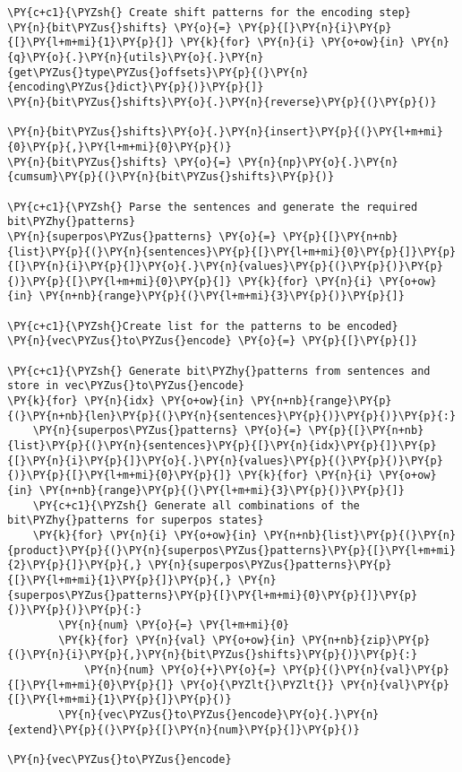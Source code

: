     \begin{tcolorbox}[breakable, size=fbox, boxrule=1pt, pad at break*=1mm,colback=cellbackground, colframe=cellborder]
\begin{Verbatim}[commandchars=\\\{\}]
\PY{c+c1}{\PYZsh{} Create shift patterns for the encoding step}
\PY{n}{bit\PYZus{}shifts} \PY{o}{=} \PY{p}{[}\PY{n}{i}\PY{p}{[}\PY{l+m+mi}{1}\PY{p}{]} \PY{k}{for} \PY{n}{i} \PY{o+ow}{in} \PY{n}{q}\PY{o}{.}\PY{n}{utils}\PY{o}{.}\PY{n}{get\PYZus{}type\PYZus{}offsets}\PY{p}{(}\PY{n}{encoding\PYZus{}dict}\PY{p}{)}\PY{p}{]}
\PY{n}{bit\PYZus{}shifts}\PY{o}{.}\PY{n}{reverse}\PY{p}{(}\PY{p}{)}

\PY{n}{bit\PYZus{}shifts}\PY{o}{.}\PY{n}{insert}\PY{p}{(}\PY{l+m+mi}{0}\PY{p}{,}\PY{l+m+mi}{0}\PY{p}{)}
\PY{n}{bit\PYZus{}shifts} \PY{o}{=} \PY{n}{np}\PY{o}{.}\PY{n}{cumsum}\PY{p}{(}\PY{n}{bit\PYZus{}shifts}\PY{p}{)}

\PY{c+c1}{\PYZsh{} Parse the sentences and generate the required bit\PYZhy{}patterns}
\PY{n}{superpos\PYZus{}patterns} \PY{o}{=} \PY{p}{[}\PY{n+nb}{list}\PY{p}{(}\PY{n}{sentences}\PY{p}{[}\PY{l+m+mi}{0}\PY{p}{]}\PY{p}{[}\PY{n}{i}\PY{p}{]}\PY{o}{.}\PY{n}{values}\PY{p}{(}\PY{p}{)}\PY{p}{)}\PY{p}{[}\PY{l+m+mi}{0}\PY{p}{]} \PY{k}{for} \PY{n}{i} \PY{o+ow}{in} \PY{n+nb}{range}\PY{p}{(}\PY{l+m+mi}{3}\PY{p}{)}\PY{p}{]}

\PY{c+c1}{\PYZsh{}Create list for the patterns to be encoded}
\PY{n}{vec\PYZus{}to\PYZus{}encode} \PY{o}{=} \PY{p}{[}\PY{p}{]}

\PY{c+c1}{\PYZsh{} Generate bit\PYZhy{}patterns from sentences and store in vec\PYZus{}to\PYZus{}encode}
\PY{k}{for} \PY{n}{idx} \PY{o+ow}{in} \PY{n+nb}{range}\PY{p}{(}\PY{n+nb}{len}\PY{p}{(}\PY{n}{sentences}\PY{p}{)}\PY{p}{)}\PY{p}{:}
    \PY{n}{superpos\PYZus{}patterns} \PY{o}{=} \PY{p}{[}\PY{n+nb}{list}\PY{p}{(}\PY{n}{sentences}\PY{p}{[}\PY{n}{idx}\PY{p}{]}\PY{p}{[}\PY{n}{i}\PY{p}{]}\PY{o}{.}\PY{n}{values}\PY{p}{(}\PY{p}{)}\PY{p}{)}\PY{p}{[}\PY{l+m+mi}{0}\PY{p}{]} \PY{k}{for} \PY{n}{i} \PY{o+ow}{in} \PY{n+nb}{range}\PY{p}{(}\PY{l+m+mi}{3}\PY{p}{)}\PY{p}{]}
    \PY{c+c1}{\PYZsh{} Generate all combinations of the bit\PYZhy{}patterns for superpos states}
    \PY{k}{for} \PY{n}{i} \PY{o+ow}{in} \PY{n+nb}{list}\PY{p}{(}\PY{n}{product}\PY{p}{(}\PY{n}{superpos\PYZus{}patterns}\PY{p}{[}\PY{l+m+mi}{2}\PY{p}{]}\PY{p}{,} \PY{n}{superpos\PYZus{}patterns}\PY{p}{[}\PY{l+m+mi}{1}\PY{p}{]}\PY{p}{,} \PY{n}{superpos\PYZus{}patterns}\PY{p}{[}\PY{l+m+mi}{0}\PY{p}{]}\PY{p}{)}\PY{p}{)}\PY{p}{:}
        \PY{n}{num} \PY{o}{=} \PY{l+m+mi}{0}
        \PY{k}{for} \PY{n}{val} \PY{o+ow}{in} \PY{n+nb}{zip}\PY{p}{(}\PY{n}{i}\PY{p}{,}\PY{n}{bit\PYZus{}shifts}\PY{p}{)}\PY{p}{:}
            \PY{n}{num} \PY{o}{+}\PY{o}{=} \PY{p}{(}\PY{n}{val}\PY{p}{[}\PY{l+m+mi}{0}\PY{p}{]} \PY{o}{\PYZlt{}\PYZlt{}} \PY{n}{val}\PY{p}{[}\PY{l+m+mi}{1}\PY{p}{]}\PY{p}{)}
        \PY{n}{vec\PYZus{}to\PYZus{}encode}\PY{o}{.}\PY{n}{extend}\PY{p}{(}\PY{p}{[}\PY{n}{num}\PY{p}{]}\PY{p}{)}
        
\PY{n}{vec\PYZus{}to\PYZus{}encode}
\end{Verbatim}
\end{tcolorbox}

